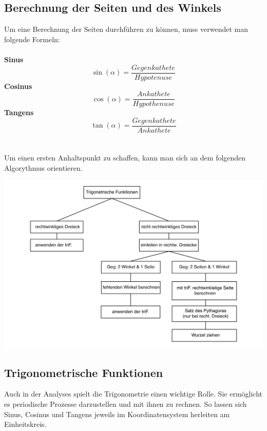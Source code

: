\subsection{Berechnung der Seiten und des Winkels}
	Um eine Berechnung der Seiten durchführen zu können, muss verwendet man folgende Formeln:\\
	\\
	
\textbf{Sinus} \[ \sin(\alpha)=\frac{Gegenkathete}{Hypotenuse} \]
\textbf{Cosinus} \[ \cos(\alpha)=\frac{Ankathete}{Hypothenuse} \]
\textbf{Tangens} \[ \tan(\alpha)=\frac{Gegenkathete}{Ankathete} \]
\\
\\
Um einen ersten Anhaltspunkt zu schaffen, kann man sich an dem folgenden Algorythmus orientieren. 

\includegraphics[width=15cm]{Media/Algorythmus_Berechnung_eines_Dreiecks}



\pagebreak

\subsection{Trigonometrische Funktionen}
 	Auch in der Analyses spielt die Trigonometrie einen wichtige Rolle. Sie ermöglicht es periodische Prozesse darzustellen und mit ihnen zu rechnen. So lassen sich Sinus, Cosinus und Tangens jeweils im Koordinatensystem herleiten am Einheitskreis.

